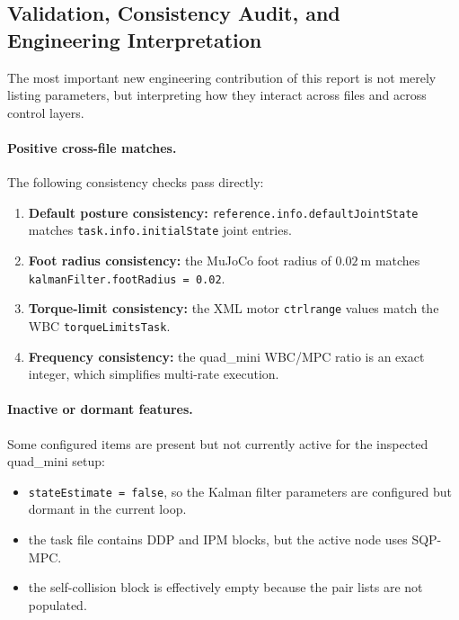 \documentclass[11pt,a4paper]{article}
\newcommand{\code}[1]{\texttt{#1}}
\begin{document}
\subsection{Validation, Consistency Audit, and Engineering Interpretation}

The most important new engineering contribution of this report is not merely listing parameters, but interpreting how they interact across
files and across control layers.

\paragraph{Positive cross-file matches.}
The following consistency checks pass directly:
\begin{enumerate}[leftmargin=*]
  \item \textbf{Default posture consistency:} \code{reference.info.defaultJointState} matches \code{task.info.initialState} joint entries.
  \item \textbf{Foot radius consistency:} the MuJoCo foot radius of $0.02~\mathrm{m}$ matches \code{kalmanFilter.footRadius = 0.02}.
  \item \textbf{Torque-limit consistency:} the XML motor \code{ctrlrange} values match the WBC \code{torqueLimitsTask}.
  \item \textbf{Frequency consistency:} the quad\_mini WBC/MPC ratio is an exact integer, which simplifies multi-rate execution.
\end{enumerate}

\paragraph{Inactive or dormant features.}
Some configured items are present but not currently active for the inspected quad\_mini setup:
\begin{itemize}[leftmargin=*]
  \item \code{stateEstimate = false}, so the Kalman filter parameters are configured but dormant in the current loop.
  \item the task file contains DDP and IPM blocks, but the active node uses SQP-MPC.
  \item the self-collision block is effectively empty because the pair lists are not populated.
\end{itemize}
\end{document}
